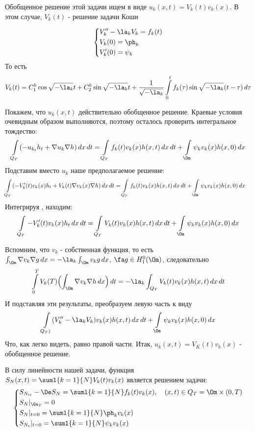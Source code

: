 \documentclass[a4paper,draft]{article}
\begin{document}
Обобщенное решение этой задачи ищем в виде $u_k(x,t)=V_k(t)
v_k(x)$. В этом случае, $V_k(t)$ - решение задачи Коши

$$
 \left\{
\begin{aligned}
&V_k''-\la_k V_k=f_k(t)\\
&V_k(0)=\ph_k\\
&V_k'(0)=\psi_k\\
\end{aligned}
\right.
$$
То есть
$$
V_k(t)=C_1^k \cos \sqrt {-\la_k} t + C_2^k \sin \sqrt
{-\la_k} t + \frac 1{\sqrt {-\la_k}} \int\limits_0^t
f_k(\tau) \sin \sqrt {-\la_k}(t-\tau)\,d\tau
$$

Покажем, что $u_k(x,t)$ действительно обобщенное решение. Краевые
условия очевидным образом выполняются, поэтому осталось проверить
интегральное тождество:
$$
\int \limits_{Q_T} (-u_{k_t} h_t+\nabla u_k \nabla h)\, dx\, dt =
\int \limits_{Q_T} f_k(t) v_k(x) h(x,t)\,dx\,dt+ \int
\limits_\Om \psi_k v_k(x) h(x,0)\,dx
$$
Подставим вместо $u_k$ наше предполагаемое решение:
$$
\int \limits_{Q_T} (-V_k'(t)v_k(x) h_t+ V_k(t)\nabla v_k(x) \nabla
h)\, dx\, dt = \int \limits_{Q_T} f_k(t) v_k(x) h(x,t)\,dx\,dt+
\int \limits_\Om \psi_k v_k(x) h(x,0)\,dx \quad
$$
Интегрируя , находим:
$$
\int \limits_{Q_T} -V_k'(t)v_k(x) h_t\, dx\, dt = \int
\limits_{Q_T} V_k(t) v_k(x) h(x,t)\, dx\, dt + \int \limits_\Om
\psi_k v_k(x) h(x,0)\,dx
$$

 Вспомним, что $v_k$ - собственная функция, то есть
$\int_\Om \nabla v_k \nabla g\, dx= -\la_k \int_\Om v_k
g\, dx$, $\fa g\in H_1^0(\Om)$, следовательно
$$
\int\limits_0^T V_k(T) \Bigl( \int_\Om \nabla v_k \nabla h\,
dx\Bigr)\, dt= -\la_k\int_{Q_T}V_k(t)v_k(x)h(x,t)\, dx\,dt
$$
И подставляя эти результаты, преобразуем левую часть к виду
$$
\int \limits_{Q_T)} (V_k''-\la_k V_k) v_k(x) h(x,t)\,dx\,dt+
\int \limits_\Om \psi_k v_k(x) h(x,0)\,dx
$$
Что, как легко видеть, равно правой части. Итак, $u_k(x,t)=V_K(t)
v_k (x)$ - обобщенное решение.

В силу линейности нашей задачи, функция $S_N(x,t)= \suml{k=1}{N}
V_k(t) v_k(x)$ является решением задачи:
$$
 \left\{
\begin{aligned}
&S_{N_{tt}}-\De S_N =\suml{k=1}{N} f_k(t)v_k(x) ,\quad (x,t)\in Q_T=\Om \times (0,T)\\
&S_N|_{\Ga_T}= 0\\
&S_N|_{t=0}=\suml{k=1}{N} \ph_k v_k(x)\\
&S_{N_t}|_{t=0}=\suml{k=1}{N} \psi_k v_k(x)\\
\end{aligned}
\right.
$$
\end{document}
